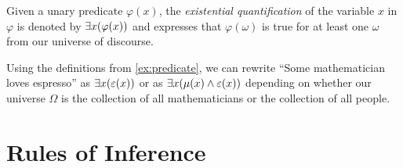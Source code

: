 \begin{definition}
    Given a unary predicate \(\varphi(x)\),
    the \emph{existential quantification} of the variable \(x\) in \(\varphi\)
    is denoted by \(\exists x \pn*{\varphi(x)}\)
    and expresses that \(\varphi(\omega)\) is true for at least one \(\omega\) from our universe of discourse.
\end{definition}
\begin{example}
    Using the definitions from \autoref{ex:predicate},
    we can rewrite ``Some mathematician loves espresso'' as
    \(\exists x \pn*{\varepsilon(x)}\) or as \(\exists x \pn*{\mu(x) \meet \varepsilon(x)}\)
    depending on whether our universe \(\Omega\)
    is the collection of all mathematicians or the collection of all people.
\end{example}

\section{Rules of Inference}

